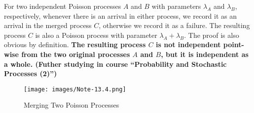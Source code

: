 \documentclass[device=normal, lang=en]{elegantbook}
\numberwithin{equation}{section}
\begin{document}
For two independent Poisson processes $A$ and $B$ with parameters $\lambda_A$ and $\lambda_B$, respectively, whenever there is an arrival in either process, we record it as an arrival in the merged process $C$, otherwise we record it as a failure. The resulting process $C$ is also a Poisson process with parameter $\lambda_A + \lambda_B$. The proof is also obvious by definition. \textbf{The resulting process $C$ is not independent point-wise from the two original processes $A$ and $B$, but it is independent as a whole. (Futher studying in course ``Probability and Stochastic Processes (2)'')}
\begin{figure}[H]
    \centering
    \texttt{[image: images/Note-13.4.png]}
    \caption{Merging Two Poisson Processes}
\end{figure}

\appendix

\end{document}
